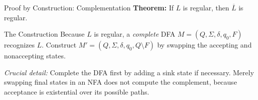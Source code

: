 \documentclass[10pt]{beamer}
\begin{document}
\begin{frame}{Proof by Construction: Complementation}
  \textbf{Theorem:} If $L$ is regular, then $\overline{L}$ is regular.
  \pause
  \vspace{0.2cm}
  
  \begin{block}{The Construction}
    Because $L$ is regular, a \emph{complete} DFA
    $M=(Q,\Sigma,\delta,q_0,F)$ recognizes $L$.
    Construct $M'=(Q,\Sigma,\delta,q_0,Q\setminus F)$ by swapping the
    accepting and nonaccepting states.
  \end{block}
  \pause
  
  \begin{center}
  \end{center}
  \pause
  \textit{Crucial detail:} Complete the DFA first by adding a sink state if
  necessary. Merely swapping final states in an NFA does not compute the
  complement, because acceptance is existential over its possible paths.
\end{frame}
\end{document}
